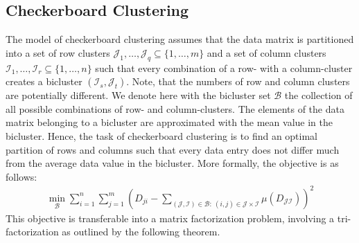 \subsection{Checkerboard Clustering}
The model of checkerboard clustering assumes that the data matrix is partitioned into a set of row clusters $\mathcal{J}_1,\ldots,\mathcal{J}_q\subseteq\{1,\ldots,m\}$ and a set of column clusters $\mathcal{I}_1,\ldots,\mathcal{I}_{r}\subseteq\{1,\ldots,n\}$ such that every combination of a row- with a column-cluster creates a bicluster $(\mathcal{I}_s,\mathcal{J}_t)$. Note, that the numbers of row and column clusters are potentially different. We denote here with the bicluster set $\mathcal{B}$ the collection of all possible combinations of row- and column-clusters. 
The elements of the data matrix belonging to a bicluster are approximated with the mean value in the bicluster. Hence, the task of checkerboard clustering is to find an optimal partition of rows and columns such that every data entry does not differ much from the average data value in the bicluster. More formally, the objective is as follows:
\begin{align}
   \min_{\mathcal{B}} \sum_{i=1}^n\sum_{j=1}^m \left(D_{ji}-\sum_{ (\mathcal{J},\mathcal{I})\in\mathcal{B}:\  (i,j)\in\mathcal{J}\times\mathcal{I}}\mu(D_{\mathcal{JI}})\right)^2 \label{eq:blockConst}
\end{align}
This objective is transferable into a matrix factorization problem, involving a tri-factorization as outlined by the following theorem.

